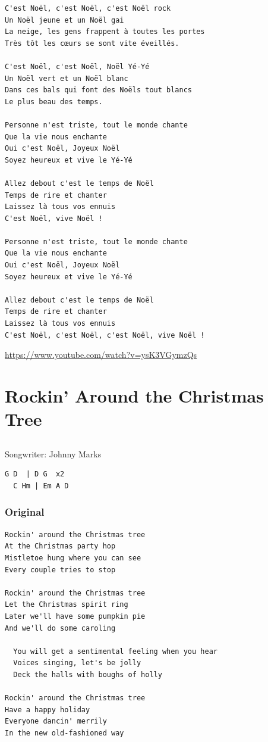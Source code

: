 \documentclass[
]{article}
\begin{document}
\begin{verbatim}
C'est Noël, c'est Noël, c'est Noël rock
Un Noël jeune et un Noël gai
La neige, les gens frappent à toutes les portes
Très tôt les cœurs se sont vite éveillés.

C'est Noël, c'est Noël, Noël Yé-Yé
Un Noël vert et un Noël blanc
Dans ces bals qui font des Noëls tout blancs
Le plus beau des temps.

Personne n'est triste, tout le monde chante
Que la vie nous enchante 
Oui c'est Noël, Joyeux Noël
Soyez heureux et vive le Yé-Yé

Allez debout c'est le temps de Noël
Temps de rire et chanter
Laissez là tous vos ennuis
C'est Noël, vive Noël ! 

Personne n'est triste, tout le monde chante
Que la vie nous enchante 
Oui c'est Noël, Joyeux Noël
Soyez heureux et vive le Yé-Yé

Allez debout c'est le temps de Noël
Temps de rire et chanter
Laissez là tous vos ennuis
C'est Noël, c'est Noël, c'est Noël, vive Noël !
\end{verbatim}

\url{https://www.youtube.com/watch?v=ysK3VGymzQs}

\hypertarget{rockin-around-the-christmas-tree}{%
\section{Rockin' Around the Christmas
Tree}\label{rockin-around-the-christmas-tree}}

\hypertarget{section-14}{%
\subsection*{}\label{section-14}}

Songwriter: Johnny Marks

\begin{verbatim}
G D  | D G  x2
  C Hm | Em A D
\end{verbatim}

\hypertarget{original-1}{%
\subsubsection{Original}\label{original-1}}

\begin{verbatim}
Rockin' around the Christmas tree
At the Christmas party hop
Mistletoe hung where you can see
Every couple tries to stop

Rockin' around the Christmas tree
Let the Christmas spirit ring
Later we'll have some pumpkin pie
And we'll do some caroling

  You will get a sentimental feeling when you hear
  Voices singing, let's be jolly
  Deck the halls with boughs of holly

Rockin' around the Christmas tree
Have a happy holiday
Everyone dancin' merrily
In the new old-fashioned way
\end{verbatim}
\end{document}
